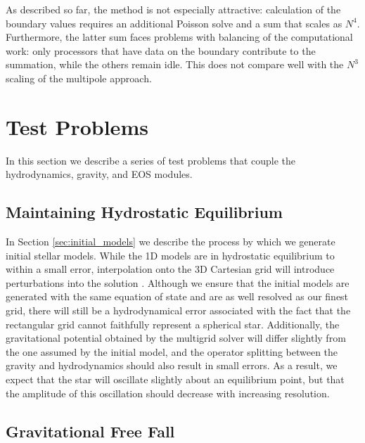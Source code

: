 \documentclass[12pt,preprint]{aastex}
\begin{document}
As described so far, the method is not especially attractive: calculation of the boundary values requires an additional Poisson solve and a sum that scales as $N^4$. Furthermore, the latter sum faces problems with balancing of the computational work: only processors that have data on the boundary contribute to the summation, while the others remain idle. This does not compare well with the $N^3$ scaling of the multipole approach.

\section{Test Problems}\label{Sec:Tests}

In this section we describe a series of test problems that couple the hydrodynamics, gravity, and EOS modules.

\subsection{Maintaining Hydrostatic Equilibrium}\label{Sec:HSE}

In Section \ref{sec:initial_models} we describe the process by which we generate initial stellar models. While the 1D models are in hydrostatic equilibrium to within a small error, interpolation onto the 3D Cartesian grid will introduce perturbations into the solution \citep{zingale:2002}. Although we ensure that the initial models are generated with the same equation of state and are as well resolved as our finest grid, there will still be a hydrodynamical error associated with the fact that the rectangular grid cannot faithfully represent a spherical star. Additionally, the gravitational potential obtained by the multigrid solver will differ slightly from the one assumed by the initial model, and the operator splitting between the gravity and hydrodynamics should also result in small errors. As a result, we expect that the star will oscillate slightly about an equilibrium point, but that the amplitude of this oscillation should decrease with increasing resolution.

\subsection{Gravitational Free Fall}\label{Sec:Gravitational Free Fall}
\end{document}
